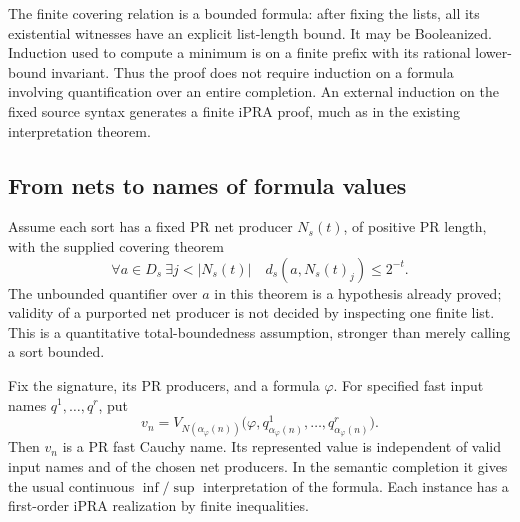 The finite covering relation is a bounded formula: after fixing the lists,
all its existential witnesses have an explicit list-length bound.  It may be
Booleanized.  Induction used to compute a minimum is on a finite prefix with
its rational lower-bound invariant.  Thus the proof does not require induction
on a formula involving quantification over an entire completion.  An external
induction on the fixed source syntax generates a finite iPRA proof, much as
in the existing interpretation theorem.

\subsection{From nets to names of formula values}

Assume each sort has a fixed PR net producer $N_s(t)$, of positive PR length,
with the supplied covering theorem
\[
       \forall a\in D_s\ \exists j<|N_s(t)|\quad
                   d_s(a,N_s(t)_j)\leq2^{-t}.
\tag{M3}\label{eq:cm-nets}
\]
The unbounded quantifier over $a$ in this theorem is a hypothesis already
proved; validity of a purported net producer is not decided by inspecting one
finite list.  This is a quantitative total-boundedness assumption, stronger
than merely calling a sort bounded.

\begin{theorem}
\label{thm:cm-values}
Fix the signature, its PR producers, and a formula $\varphi$.  For specified
fast input names $q^1,\ldots,q^r$, put
\[
 v_n=V_{N(\alpha_\varphi(n))}
       \bigl(\varphi,q^1_{\alpha_\varphi(n)},\ldots,
                          q^r_{\alpha_\varphi(n)}\bigr).
\tag{M4}\label{eq:cm-formula-name}
\]
Then $v_n$ is a PR fast Cauchy name.  Its represented value is independent of
valid input names and of the chosen net producers.  In the semantic
completion it gives the usual continuous $\inf/\sup$ interpretation of the
formula.  Each instance has a first-order iPRA realization by finite
inequalities.
\end{theorem}

